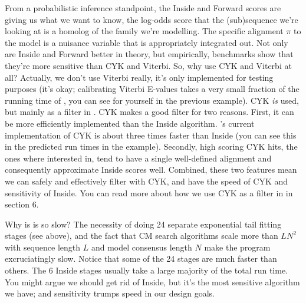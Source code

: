 From a probabilistic inference standpoint, the Inside and Forward
scores are giving us what we want to know, the log-odds score that the
(sub)sequence we're looking at is a homolog of the family we're
modelling. The specific alignment $\pi$ to the model is a nuisance
variable that is appropriately integrated out. Not only are Inside and
Forward better in theory, but empirically, benchmarks show that
they're more sensitive than CYK and Viterbi. So, why use CYK and
Viterbi at all?  Actually, we don't use Viterbi really, it's
only implemented for testing purposes (it's okay; calibrating Viterbi
E-values takes a very small fraction of the running time of
, you can see for yourself in the previous
example). CYK \emph{is} used, but mainly as a filter in
. CYK makes a good filter for two reasons. First, it can be
more efficiently implemented than the Inside
algorithm. 's current implementation of CYK is
about three times faster than Inside (you can see this in the
predicted run times in the  example). Secondly,
high scoring CYK hits, the ones where interested in, tend to have a
single well-defined alignment and consequently approximate Inside
scores well. Combined, these two features mean we can safely and
effectively filter with CYK, and have the speed of CYK and sensitivity
of Inside. You can read more about how we use CYK as a filter in
 in section 6.


\begin{srefaq}{Why is  is so slow?} The
    necessity of doing 24 separate exponential tail fitting stages
    (see above), and the fact that CM search algorithms scale more
    than $LN^2$ with sequence length $L$ and model consensus length
    $N$ make the program excruciatingly slow. Notice that some of the
    24 stages are much faster than others. The 6 Inside stages usually
    take a large majority of the total run time. You might argue we
    should get rid of Inside, but it's the most sensitive algorithm we
    have; and sensitivity trumps speed in our design goals.
\end{srefaq}


